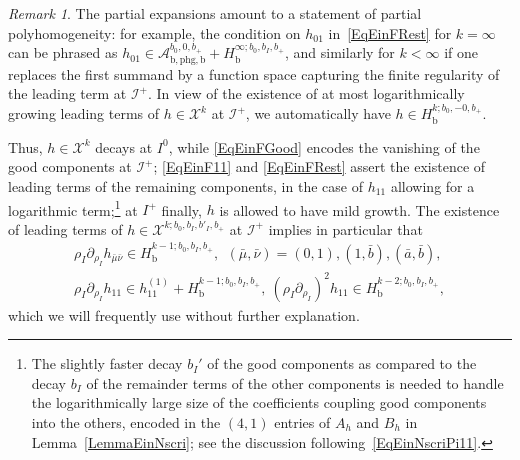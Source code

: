 \documentclass[reqno,11pt,letterpaper]{amsart}
\numberwithin{equation}{section}
\numberwithin{figure}{section}
\theoremstyle{definition}
\theoremstyle{remark}
\newtheorem{rmk}[thm]{Remark}
\newcommand{\mc}{\mathcal}
\newcommand{\cA}{\mc A}
\newcommand{\cX}{\mc X}
\newcommand{\ms}{\mathscr}
\newcommand{\scri}{\ms I}
\newcommand{\pa}{\partial}
\newcommand{\bop}{{\mathrm{b}}}
\newcommand{\Hb}{H_{\bop}}
\newcommand{\phg}{{\mathrm{phg}}}
\begin{document}
\begin{rmk}
  The partial expansions amount to a statement of partial polyhomogeneity: for example, the condition on $h_{0 1}$ in~\eqref{EqEinFRest} for $k=\infty$ can be phrased as $h_{0 1}\in\cA_{\bop,\phg,\bop}^{b_0,0,b_+}+\Hb^{\infty;b_0,b_I,b_+}$, and similarly for $k<\infty$ if one replaces the first summand by a function space capturing the finite regularity of the leading term at $\scri^+$. In view of the existence of at most logarithmically growing leading terms of $h\in\cX^k$ at $\scri^+$, we automatically have $h\in\Hb^{k;b_0,-0,b_+}$.
\end{rmk}

Thus, $h\in\cX^k$ decays at $I^0$, while \eqref{EqEinFGood} encodes the vanishing of the good components at $\scri^+$; \eqref{EqEinF11} and \eqref{EqEinFRest} assert the existence of leading terms of the remaining components, in the case of $h_{1 1}$ allowing for a logarithmic term;\footnote{The slightly faster decay $b_I'$ of the good components as compared to the decay $b_I$ of the remainder terms of the other components is needed to handle the logarithmically large size of the coefficients coupling good components into the others, encoded in the $(4,1)$ entries of $A_h$ and $B_h$ in Lemma~\ref{LemmaEinNscri}; see the discussion following~\eqref{EqEinNscriPi11}.} at $I^+$ finally, $h$ is allowed to have mild growth. The existence of leading terms of $h\in\cX^{k;b_0,b_I,b'_I,b_+}$ at $\scri^+$ implies in particular that
\begin{equation}
\label{EqEinFLeading}
\begin{gathered}
  \rho_I\pa_{\rho_I}h_{\bar\mu\bar\nu}\in\Hb^{k-1;b_0,b_I,b_+},\ \ (\bar\mu,\bar\nu)=(0,1),(1,\bar b),(\bar a,\bar b), \\
  \rho_I\pa_{\rho_I}h_{1 1}\in h_{1 1}^{(1)}+\Hb^{k-1;b_0,b_I,b_+},\ (\rho_I\pa_{\rho_I})^2 h_{1 1}\in\Hb^{k-2;b_0,b_I,b_+},
\end{gathered}
\end{equation}
which we will frequently use without further explanation.
\end{document}
